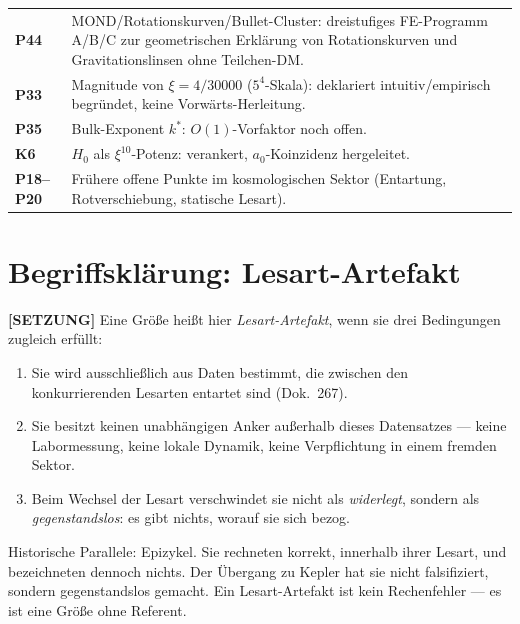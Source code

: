 \documentclass[11pt]{report}
\begin{document}
\medskip
\begin{tabular}{@{}lp{10.5cm}}
\textbf{P44}  & MOND/Rotationskurven/Bullet-Cluster: dreistufiges FE-Programm
                A/B/C zur geometrischen Erklärung von Rotationskurven und
                Gravitationslinsen ohne Teilchen-DM. \\[4pt]
\textbf{P33}  & Magnitude von $\xi = 4/30000$ ($5^4$-Skala): deklariert
                intuitiv/empirisch begründet, keine Vorwärts-Herleitung. \\[4pt]
\textbf{P35}  & Bulk-Exponent $k^*$: $O(1)$-Vorfaktor noch offen. \\[4pt]
\textbf{K6}   & $H_0$ als $\xi^{10}$-Potenz: verankert, $a_0$-Koinzidenz
                hergeleitet. \\[4pt]
\textbf{P18--P20} & Frühere offene Punkte im kosmologischen Sektor
                (Entartung, Rotverschiebung, statische Lesart). \\
\end{tabular}

\chapter{Begriffsklärung: Lesart-Artefakt}

\textbf{[SETZUNG]} Eine Größe heißt hier \emph{Lesart-Artefakt}, wenn sie drei
Bedingungen zugleich erfüllt:

\begin{enumerate}
  \item Sie wird ausschließlich aus Daten bestimmt, die zwischen den
        konkurrierenden Lesarten entartet sind (Dok.~267).
  \item Sie besitzt keinen unabhängigen Anker außerhalb dieses
        Datensatzes — keine Labormessung, keine lokale Dynamik, keine
        Verpflichtung in einem fremden Sektor.
  \item Beim Wechsel der Lesart verschwindet sie nicht als
        \emph{widerlegt}, sondern als \emph{gegenstandslos}: es gibt
        nichts, worauf sie sich bezog.
\end{enumerate}

Historische Parallele: Epizykel. Sie rechneten korrekt, innerhalb ihrer
Lesart, und bezeichneten dennoch nichts. Der Übergang zu Kepler hat sie
nicht falsifiziert, sondern gegenstandslos gemacht. Ein Lesart-Artefakt
ist kein Rechenfehler — es ist eine Größe ohne Referent.
\end{document}
